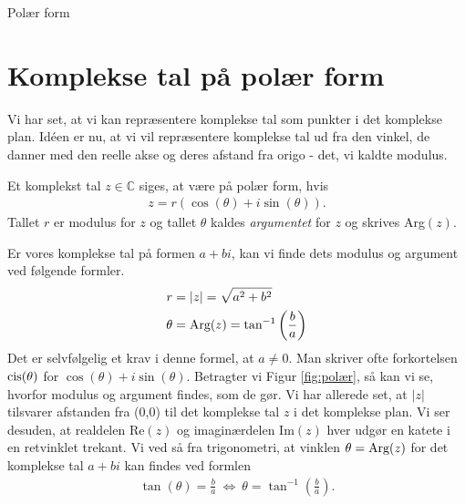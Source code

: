 \begin{center}
\Huge
	Polær form
\end{center}
\section*{Komplekse tal på polær form}

Vi har set, at vi kan repræsentere komplekse tal som punkter i det komplekse plan. Idéen er nu, at vi vil repræsentere komplekse tal ud fra den vinkel, de danner med den reelle akse og deres afstand fra origo - det, vi kaldte modulus. 

\begin{setn}
	Et komplekst tal $z \in \mathbb{C}$ siges, at være på polær form, hvis 
	\begin{align*}
		z = r(\cos(\theta) + i \sin(\theta)).
	\end{align*}
	Tallet $r$ er modulus for $z$ og tallet $\theta$ kaldes \textit{argumentet} for $z$ og skrives Arg$(z)$.
\end{setn}
Er vores komplekse tal på formen $a + bi$, kan vi finde dets modulus og argument ved følgende formler.
\begin{align*}
	r &= |z| = \sqrt{a^2 + b^2}\\
	\theta &= \textnormal{Arg}(z) = \tan^{-1}\left(\frac{b}{a}\right)
\end{align*}
Det er selvfølgelig et krav i denne formel, at $a \neq 0$. 
Man skriver ofte forkortelsen $\textnormal{cis}(\theta)$ for $\cos(\theta) + i\sin(\theta)$. Betragter vi Figur \ref{fig:polær}, så kan vi se, hvorfor modulus og argument findes, som de gør. Vi har allerede set, at $|z|$ tilsvarer
afstanden fra (0,0) til det komplekse tal $z$ i det komplekse plan. Vi ser desuden, at realdelen Re$(z)$ og imaginærdelen
Im$(z)$ hver udgør en katete i en retvinklet trekant. Vi ved så fra trigonometri, at vinklen 
$\theta = \textnormal{Arg}(z)$ for det komplekse tal $a + bi$ kan findes ved formlen
\begin{align*}
	\tan(\theta) = \frac{b}{a} \ \Leftrightarrow \ \theta = \tan^{-1}\left(\frac{b}{a}\right).
\end{align*}
